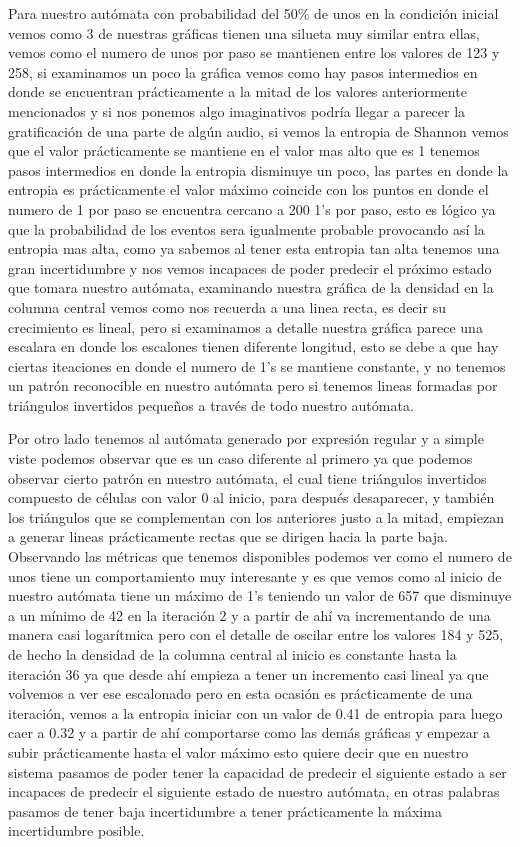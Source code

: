 \documentclass[11pt]{article}
\begin{document}
		Para nuestro autómata con probabilidad del 50\% de unos en la condición inicial vemos como 3 de nuestras gráficas tienen una silueta muy similar entra ellas, vemos como el numero de unos por paso se mantienen entre los valores de 123 y 258, si examinamos un poco la gráfica vemos como hay pasos intermedios en donde se encuentran prácticamente a la mitad de los valores anteriormente mencionados y si nos ponemos algo imaginativos podría llegar a parecer la gratificación de una parte de algún audio, si vemos la entropia de Shannon vemos que el valor prácticamente se mantiene en el valor mas alto que es 1 tenemos pasos intermedios en donde la entropia disminuye un poco, las partes en donde la entropia es prácticamente el valor máximo coincide con los puntos en donde el numero de 1 por paso se encuentra cercano a 200 1's por paso, esto es lógico ya que la probabilidad de los eventos sera igualmente probable provocando así la entropia mas alta, como ya sabemos al tener esta entropia tan alta tenemos una gran incertidumbre y nos vemos incapaces de poder predecir el próximo estado que tomara nuestro autómata, examinando nuestra gráfica de la densidad en la columna central vemos como nos recuerda a una linea recta, es decir su crecimiento es lineal, pero si examinamos a detalle nuestra gráfica parece una escalara en donde los escalones tienen diferente longitud, esto se debe a que hay ciertas iteaciones en donde el numero de 1's se mantiene constante, y no tenemos un patrón reconocible en nuestro autómata pero si tenemos lineas formadas por triángulos invertidos pequeños a través de todo nuestro autómata.\par
		 Por otro lado tenemos al autómata generado por expresión regular y a simple viste podemos observar que es un caso diferente al primero ya que podemos observar cierto patrón en nuestro autómata, el cual tiene triángulos invertidos compuesto de células con valor 0 al inicio, para después desaparecer, y también los triángulos que se complementan con los anteriores justo a la mitad, empiezan a generar lineas prácticamente rectas que se dirigen hacia la parte baja. Observando las métricas que tenemos disponibles podemos ver como el numero de unos tiene un comportamiento muy interesante y es que vemos como al inicio de nuestro autómata tiene un máximo de 1's teniendo un valor de 657 que disminuye a un mínimo de 42 en la iteración 2 y a partir de ahí va incrementando de una manera casi logarítmica pero con el detalle de oscilar entre los valores 184 y 525, de hecho la densidad de la columna central al inicio es constante hasta la iteración 36 ya que desde ahí empieza a tener un incremento casi lineal ya que volvemos a ver ese escalonado pero en esta ocasión es prácticamente de una iteración, vemos a la entropia iniciar con un valor de 0.41 de entropia para luego caer a 0.32 y a partir de ahí comportarse como las demás gráficas y empezar a subir prácticamente hasta el valor máximo esto quiere decir que en nuestro sistema pasamos de poder tener la capacidad de predecir el siguiente estado a ser incapaces de predecir el siguiente estado de nuestro autómata, en otras palabras pasamos de tener baja incertidumbre a tener prácticamente la máxima incertidumbre posible.\par
\end{document}
